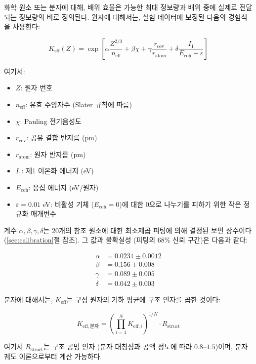 \documentclass[12pt,a4paper]{article}
\newcommand{\Keff}{K_{\mathrm{eff}}}
\newcommand{\Rstruct}{R_{\mathrm{struct}}}
\begin{document}
	화학 원소 또는 분자에 대해, 배위 효율은 가능한 최대 정보량과 배위 중에 실제로 전달되는 정보량의 비로 정의된다. 원자에 대해서는, 실험 데이터에 보정된 다음의 경험식을 사용한다:
	
	\begin{equation}
		\Keff(Z) = \exp\left[\alpha \frac{Z^{2/3}}{n_{\text{eff}}} + \beta \chi + \gamma \frac{r_{\text{cov}}}{r_{\text{atom}}} + \delta \frac{I_1}{E_{\text{coh}} + \varepsilon}\right]
		\label{eq:keff-element}
	\end{equation}
	
	여기서:
	\begin{itemize}
		\item $Z$: 원자 번호
		\item $n_{\text{eff}}$: 유효 주양자수 (Slater 규칙에 따름)
		\item $\chi$: Pauling 전기음성도
		\item $r_{\text{cov}}$: 공유 결합 반지름 (pm)
		\item $r_{\text{atom}}$: 원자 반지름 (pm)
		\item $I_1$: 제1 이온화 에너지 (eV)
		\item $E_{\text{coh}}$: 응집 에너지 (eV/원자)
		\item $\varepsilon = 0.01$ eV: 비활성 기체 ($E_{\text{coh}} = 0$)에 대한 0으로 나누기를 피하기 위한 작은 정규화 매개변수
	\end{itemize}
	
	계수 $\alpha, \beta, \gamma, \delta$는 20개의 참조 원소에 대한 최소제곱 피팅에 의해 결정된 보편 상수이다 (\ref{sec:calibration}절 참조). 그 값과 불확실성 (피팅의 68\% 신뢰 구간)은 다음과 같다:
	
	\begin{align}
		\alpha &= 0.0231 \pm 0.0012 \\
		\beta &= 0.156 \pm 0.008 \\
		\gamma &= 0.089 \pm 0.005 \\
		\delta &= 0.042 \pm 0.003
	\end{align}
	
	분자에 대해서는, $\Keff$는 구성 원자의 기하 평균에 구조 인자를 곱한 것이다:
	
	\begin{equation}
		K_{\mathrm{eff},\text{분자}} = \left(\prod_{i=1}^{N} K_{\mathrm{eff},i}\right)^{1/N} \cdot \Rstruct
		\label{eq:keff-molecule}
	\end{equation}
	
	여기서 $\Rstruct$는 구조 공명 인자 (분자 대칭성과 공액 정도에 따라 $0.8$--$1.5$)이며, 분자 궤도 이론으로부터 계산 가능하다.
	
\end{document}
